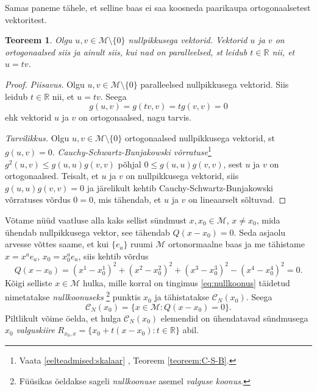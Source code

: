 \documentclass[12pt,a4paper,oneside]{article}
\theoremstyle{plain}
\newtheorem{teoreem}{Teoreem}[section]
\theoremstyle{definition}
\numberwithin{equation}{section}
\def\R{{\mathbb R}}
\def\M{{\mathcal M}}
\begin{document}
Samas paneme tähele, et selline baas ei saa koosneda paarikaupa 
ortogonaalsetest vektoritest.
\begin{teoreem}
Olgu $u, v \in \M \setminus \{0\}$ nullpikkusega vektorid. Vektorid 
$u$ ja $v$ on ortogonaalsed siis ja ainult siis, kui nad on 
paralleelsed, st leidub $t \in \R$ nii, et $u = tv$.
\end{teoreem}
\begin{proof}
\emph{Piisavus.} Olgu $u, v \in \M \setminus \{0\}$ paralleelsed 
nullpikkusega vektorid. Siis leidub $t \in \R$ nii, et $u = tv$. 
Seega
\[g\left(u, v\right) = g \left(tv, v\right) = 
t g \left(v, v\right) = 0\]
ehk vektorid $u$ ja $v$ on ortogonaalsed, nagu tarvis.

\emph{Tarvilikkus.} Olgu $u, v \in \M \setminus \{0\}$ ortogonaalsed 
nullpikkusega vektorid, st $g \left(u, v\right) = 0$. 
\emph{Cauchy-Schwartz-Bunjakowski võrratuse}\footnote{Vaata 
\ref{eelteadmised:skalaar} , Teoreem 
\ref{teoreem:C-S-B}.} $g^2 \left(u, v \right) \leq 
g \left(u, u \right) g \left(v, v \right)$ põhjal 
$0 \leq g \left(u, u \right) g \left(v, v \right)$, sest $u$ ja $v$ 
on ortogonaalsed. Teisalt, et $u$ ja $v$ on nullpikkusega vektorid, 
siis $g \left(u, u \right) g \left(v, v \right) = 0$ ja järelikult 
kehtib Cauchy-Schwartz-Bunjakowski võrratuses võrdus $0 = 0$, mis 
tähendab, et $u$ ja $v$ on lineaarselt sõltuvad.
\end{proof}

Võtame nüüd vaatluse alla kaks sellist sündmust $x, x_0 \in \M$, 
$x \neq x_0$, mida ühendab nullpikkusega vektor, see tähendab 
$Q \left(x- x_0\right) = 0$. Seda asjaolu arvesse võttes saame, 
et kui $\{e_a\}$ ruumi $\M$ ortonormaalne baas ja me tähistame 
$x = x^a e_a$, $x_0 = x_0^a e_a$, siis kehtib võrdus
\begin{equation} \label{eq:nullkoonus}
Q \left(x - x_0\right) = \left(x^1 - x_0^1\right)^2 + 
\left(x^2 - x_0^2\right)^2 + \left(x^3 - x_0^3\right)^2 - 
\left(x^4 - x_0^4\right)^2 = 0.
\end{equation}
Kõigi selliste $x \in \M$ hulka, mille korral on tingimus 
\ref{eq:nullkoonus} täidetud nimetatakse \emph{nullkoonuseks}
\footnote{Füüsikas öeldakse sageli \emph{nullkoonuse} asemel 
\emph{valguse koonus}.} punktis $x_0$ ja tähistatakse 
$\mathcal{C}_N\left(x_0\right)$. Seega 
\[\mathcal{C}_N\left(x_0\right) = \{x \in \M : Q \left(x- x_0\right) 
= 0 \}.\]
Piltlikult võime öelda, et hulga $\mathcal{C}_N\left(x_0\right)$ 
elemendid on ühendatavad sündmusega $x_0$ \emph{valguskiire} 
$R_{x_0, x} = \{x_0 + t\left(x - x_0\right) : t \in \R \}$ abil.
\end{document}
